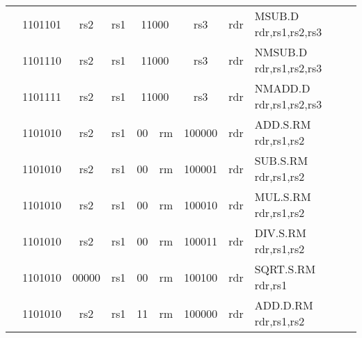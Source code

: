\begin{table}[p]
\begin{small}
\begin{center}
\begin{tabular}{rcccccccccccl}
&
\multicolumn{2}{|c|}{1101101} &
\multicolumn{1}{c|}{rs2} &
\multicolumn{1}{c|}{rs1} &
\multicolumn{4}{c|}{11000} &
\multicolumn{2}{c|}{rs3} &
\multicolumn{1}{c|}{rdr} & MSUB.D rdr,rs1,rs2,rs3 \\
\cline{2-12}
  

&
\multicolumn{2}{|c|}{1101110} &
\multicolumn{1}{c|}{rs2} &
\multicolumn{1}{c|}{rs1} &
\multicolumn{4}{c|}{11000} &
\multicolumn{2}{c|}{rs3} &
\multicolumn{1}{c|}{rdr} & NMSUB.D rdr,rs1,rs2,rs3 \\
\cline{2-12}
  

&
\multicolumn{2}{|c|}{1101111} &
\multicolumn{1}{c|}{rs2} &
\multicolumn{1}{c|}{rs1} &
\multicolumn{4}{c|}{11000} &
\multicolumn{2}{c|}{rs3} &
\multicolumn{1}{c|}{rdr} & NMADD.D rdr,rs1,rs2,rs3 \\
\cline{2-12}
  

&
\multicolumn{2}{|c|}{1101010} &
\multicolumn{1}{c|}{rs2} &
\multicolumn{1}{c|}{rs1} &
\multicolumn{1}{c|}{00} &
\multicolumn{2}{c|}{rm} &
\multicolumn{3}{c|}{100000} &
\multicolumn{1}{c|}{rdr} & ADD.S.RM rdr,rs1,rs2 \\
\cline{2-12}
  

&
\multicolumn{2}{|c|}{1101010} &
\multicolumn{1}{c|}{rs2} &
\multicolumn{1}{c|}{rs1} &
\multicolumn{1}{c|}{00} &
\multicolumn{2}{c|}{rm} &
\multicolumn{3}{c|}{100001} &
\multicolumn{1}{c|}{rdr} & SUB.S.RM rdr,rs1,rs2 \\
\cline{2-12}
  

&
\multicolumn{2}{|c|}{1101010} &
\multicolumn{1}{c|}{rs2} &
\multicolumn{1}{c|}{rs1} &
\multicolumn{1}{c|}{00} &
\multicolumn{2}{c|}{rm} &
\multicolumn{3}{c|}{100010} &
\multicolumn{1}{c|}{rdr} & MUL.S.RM rdr,rs1,rs2 \\
\cline{2-12}
  

&
\multicolumn{2}{|c|}{1101010} &
\multicolumn{1}{c|}{rs2} &
\multicolumn{1}{c|}{rs1} &
\multicolumn{1}{c|}{00} &
\multicolumn{2}{c|}{rm} &
\multicolumn{3}{c|}{100011} &
\multicolumn{1}{c|}{rdr} & DIV.S.RM rdr,rs1,rs2 \\
\cline{2-12}
  

&
\multicolumn{2}{|c|}{1101010} &
\multicolumn{1}{c|}{00000} &
\multicolumn{1}{c|}{rs1} &
\multicolumn{1}{c|}{00} &
\multicolumn{2}{c|}{rm} &
\multicolumn{3}{c|}{100100} &
\multicolumn{1}{c|}{rdr} & SQRT.S.RM rdr,rs1 \\
\cline{2-12}
  

&
\multicolumn{2}{|c|}{1101010} &
\multicolumn{1}{c|}{rs2} &
\multicolumn{1}{c|}{rs1} &
\multicolumn{1}{c|}{11} &
\multicolumn{2}{c|}{rm} &
\multicolumn{3}{c|}{100000} &
\multicolumn{1}{c|}{rdr} & ADD.D.RM rdr,rs1,rs2 \\
\cline{2-12}
  


\end{tabular}
\end{center}
\end{small}
\end{table}
